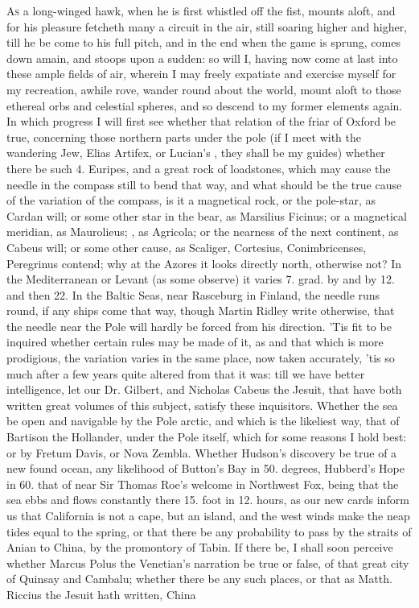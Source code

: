 {\lettrine{A}{s} a long-winged hawk, when he is first whistled off the fist, mounts aloft, and for his pleasure fetcheth many a circuit in the air, still soaring higher and higher, till he be come to his full pitch, and in the end when the game is sprung, comes down amain, and stoops upon a sudden: so will I, having now come at last into these ample fields of air, wherein I may freely expatiate and exercise myself for my recreation, awhile rove, wander round about the world, mount aloft to those ethereal orbs and celestial spheres, and so descend to my former elements again. In which progress I will first see whether that relation of the friar of Oxford be true, concerning those northern parts under the pole (if I meet  with the wandering Jew, Elias Artifex, or Lucian's , they shall be my guides) whether there be such 4. Euripes, and a great rock of loadstones, which may cause the needle in the compass still to bend that way, and what should be the true cause of the variation of the compass, is it a magnetical rock, or the pole-star, as Cardan will; or some other star in the bear, as Marsilius Ficinus; or a magnetical meridian, as Maurolieus; , as Agricola; or the nearness of the next continent, as Cabeus will; or some other cause, as Scaliger, Cortesius, Conimbricenses, Peregrinus contend; why at the Azores it looks directly north, otherwise not? In the Mediterranean or Levant (as some observe) it varies 7. grad. by and by 12. and then 22. In the Baltic Seas, near Rasceburg in Finland, the needle runs round, if any ships come that way, though Martin Ridley write otherwise, that the needle near the Pole will hardly be forced from his direction. 'Tis fit to be inquired whether certain rules may be made of it, as  \etc{} and that which is more prodigious, the variation varies in the same place, now taken accurately, 'tis so much after a few years quite altered from that it was: till we have better intelligence, let our Dr. Gilbert, and Nicholas Cabeus the Jesuit, that have both written great volumes of this subject, satisfy these inquisitors. Whether the sea be open and navigable by the Pole arctic, and which is the likeliest way, that of Bartison the Hollander, under the Pole itself, which for some reasons I hold best: or by Fretum Davis, or Nova Zembla. Whether Hudson's discovery be true of a new found ocean, any likelihood of Button's Bay in 50. degrees, Hubberd's Hope in 60. that of  near Sir Thomas Roe's welcome in Northwest Fox, being that the sea ebbs and flows constantly there 15. foot in 12. hours, as our new cards inform us that California is not a cape, but an island, and the west winds make the neap tides equal to the spring, or that there be any probability to pass by the straits of Anian to China, by the promontory of Tabin. If there be, I shall soon perceive whether Marcus Polus the Venetian's narration be true or false, of that great city of Quinsay and Cambalu; whether there be any such places, or that as Matth. Riccius the Jesuit hath written, China }
